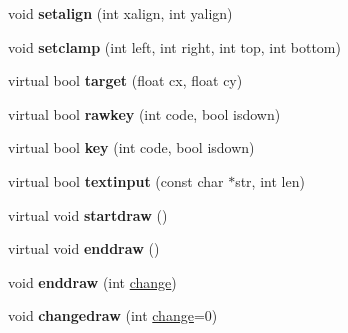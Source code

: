\begin{DoxyCompactItemize}
\item 
\mbox{\label{struct_u_i_1_1_object_a687c55785b4622400a8fda201cc851e1}} 
void {\bfseries setalign} (int xalign, int yalign)
\item 
\mbox{\label{struct_u_i_1_1_object_acfea6736f7d4bb61582b21019885c682}} 
void {\bfseries setclamp} (int left, int right, int top, int bottom)
\item 
\mbox{\label{struct_u_i_1_1_object_a091b07e01c8ec03e32af5dcf533b8804}} 
virtual bool {\bfseries target} (float cx, float cy)
\item 
\mbox{\label{struct_u_i_1_1_object_ae41b8dd060dccf3cebf18f6b5b83a22b}} 
virtual bool {\bfseries rawkey} (int code, bool isdown)
\item 
\mbox{\label{struct_u_i_1_1_object_a3ba0f13f55497c99edaba7d94ff1826b}} 
virtual bool {\bfseries key} (int code, bool isdown)
\item 
\mbox{\label{struct_u_i_1_1_object_ae957006c88a15a7b6462a0b906a827c4}} 
virtual bool {\bfseries textinput} (const char $\ast$str, int len)
\item 
\mbox{\label{struct_u_i_1_1_object_a5071f6fba6f5f702a1e390b80f6de380}} 
virtual void {\bfseries startdraw} ()
\item 
\mbox{\label{struct_u_i_1_1_object_a7bdadc267bda0ee7dc89d4a25682cdb8}} 
virtual void {\bfseries enddraw} ()
\item 
\mbox{\label{struct_u_i_1_1_object_a0c66755aa5e9e34756eca89e86331146}} 
void {\bfseries enddraw} (int \hyperlink{structchange}{change})
\item 
\mbox{\label{struct_u_i_1_1_object_a72e3e71d0957c39f8650a2c3a353549a}} 
void {\bfseries changedraw} (int \hyperlink{structchange}{change}=0)
\item 
\mbox{\label{struct_u_i_1_1_object_a7e1c27b3073b914bd0c67496411053f6}} 

\end{DoxyCompactItemize}
